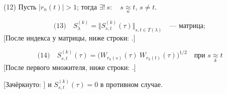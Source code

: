 (12) Пусть $|r_n(t)|>1$; тогда $\exists!\ s:\quad s\underset{n}{\approx}t$, $s\ne t$.

\begin{equation*}
\text{(13)}\quad S_\lambda^{(k)}=\Vert S_{s,t}^{(k)}(\tau)\Vert_{s,t\in T(\lambda)}
\quad\text{--- матрица};
\end{equation*}
[После индекса у матрицы, ниже строки:
.]

\begin{equation*}
\text{(14)}\quad
S_{s,t}^{(k)}(\tau)=\bigl(W_{r_k(s)}(\tau)\ W_{r_k(t)}(\tau)\bigr)^{1/2}
\quad\text{при }s\underset{k}{\approx}t
\end{equation*}
[После первого множителя, ниже строки:
.]

[Зачёркнуто: ]
и $S_{s,t}^{(k)}(\tau)=0$ в противном случае.

